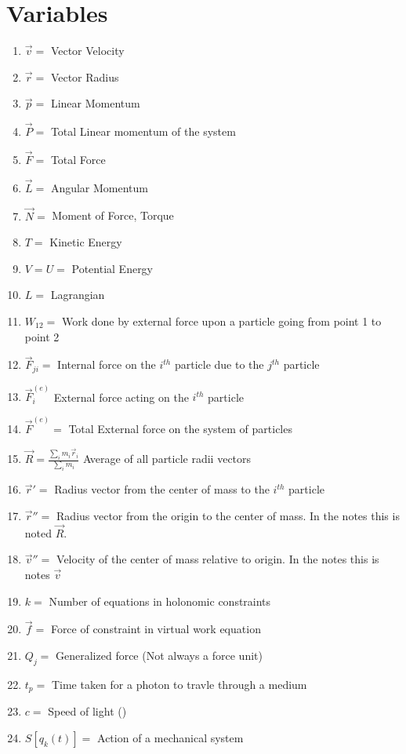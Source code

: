 \documentclass[12pt]{article}
\begin{document}
\section{Variables}
    \begin{enumerate}
        \item $\vec{v} = $ Vector Velocity 
        \item $\vec{r} = $ Vector Radius
        \item $\vec{p} = $ Linear Momentum %
        \item $\vec{P} = $ Total Linear momentum of the system
        \item $\vec{F} = $ Total Force %
        \item $\vec{L} =$ Angular Momentum
        \item $\vec{N} = $ Moment of Force, Torque
        \item $T = $ Kinetic Energy
        \item $V = U = $ Potential Energy
        \item $L = $ Lagrangian
        \item $W_{12} = $ Work done by external force upon a particle going from point 1 to point 2
        \item $\vec{F}_{ji} = $ Internal force on the $i^{th}$ particle due to the $j^{th}$ particle
        \item $\vec{F}_i^{(e)}$ External force acting on the $i^{th}$ particle
        \item $\vec{F}^{(e)} = $ Total External force on the system of particles
        \item $\vec{R} = \frac{\sum_i m_i \vec{r}_i}{\sum_i m_i}$ Average of all particle radii vectors
        \item $\vec{r}' = $ Radius vector from the center of mass to the $i^{th}$ particle
        \item $\vec{r}'' = $ Radius vector from the origin to the center of mass. In the notes this is noted $\vec{R}$.
        \item $\vec{v}'' = $ Velocity of the center of mass relative to origin. In the notes this is notes $\vec{v}$
        \item $k = $ Number of equations in holonomic constraints
        \item $\vec{f} = $ Force of constraint in virtual work equation
        \item $Q_j = $ Generalized force (Not always a force unit)
        \item $t_p = $ Time taken for a photon to travle through a medium
        \item $c = $ Speed of light ()
        \item $S[q_k(t)] = $ Action of a mechanical system
    \end{enumerate}
\end{document}
